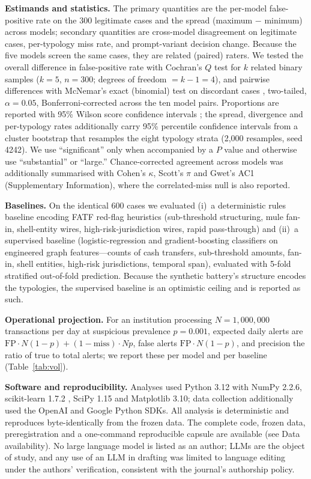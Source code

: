\documentclass[lineno,pdflatex,sn-basic,Numbered]{sn-jnl}
\begin{document}
\textbf{Estimands and statistics.} The primary quantities are the per-model false-positive rate on the 300 legitimate cases and the spread (maximum $-$ minimum) across models; secondary quantities are cross-model disagreement on legitimate cases, per-typology miss rate, and prompt-variant decision change. Because the five models screen the same cases, they are related (paired) raters. We tested the overall difference in false-positive rate with Cochran's $Q$ test for $k$ related binary samples \cite{cochran} ($k=5$, $n=300$; degrees of freedom $=k-1=4$), and pairwise differences with McNemar's exact (binomial) test on discordant cases \cite{mcnemar}, two-tailed, $\alpha=0.05$, Bonferroni-corrected across the ten model pairs. Proportions are reported with 95\% Wilson score confidence intervals \cite{wilson}; the spread, divergence and per-typology rates additionally carry 95\% percentile confidence intervals from a cluster bootstrap \cite{bootstrap} that resamples the eight typology strata (2,000 resamples, seed 4242). We use ``significant'' only when accompanied by a $P$ value and otherwise use ``substantial'' or ``large.'' Chance-corrected agreement across models was additionally summarised with Cohen's $\kappa$, Scott's $\pi$ and Gwet's AC1 \cite{gwet} (Supplementary Information), where the correlated-miss null is also reported.

\textbf{Baselines.} On the identical 600 cases we evaluated (i)~a deterministic rules baseline encoding FATF red-flag heuristics (sub-threshold structuring, mule fan-in, shell-entity wires, high-risk-jurisdiction wires, rapid pass-through) and (ii)~a supervised baseline (logistic-regression and gradient-boosting classifiers on engineered graph features---counts of cash transfers, sub-threshold amounts, fan-in, shell entities, high-risk jurisdictions, temporal span), evaluated with 5-fold stratified out-of-fold prediction. Because the synthetic battery's structure encodes the typologies, the supervised baseline is an optimistic ceiling and is reported as such.

\textbf{Operational projection.} For an institution processing $N=1{,}000{,}000$ transactions per day at suspicious prevalence $p=0.001$, expected daily alerts are $\mathrm{FP}\cdot N(1-p) + (1-\mathrm{miss})\cdot Np$, false alerts $\mathrm{FP}\cdot N(1-p)$, and precision the ratio of true to total alerts; we report these per model and per baseline (Table~\ref{tab:vol}).

\textbf{Software and reproducibility.} Analyses used Python 3.12 with NumPy 2.2.6, scikit-learn 1.7.2 \cite{sklearn}, SciPy 1.15 and Matplotlib 3.10; data collection additionally used the OpenAI and Google Python SDKs. All analysis is deterministic and reproduces byte-identically from the frozen data. The complete code, frozen data, preregistration and a one-command reproducible capsule are available (see Data availability). No large language model is listed as an author; LLMs are the object of study, and any use of an LLM in drafting was limited to language editing under the authors' verification, consistent with the journal's authorship policy.
\end{document}

